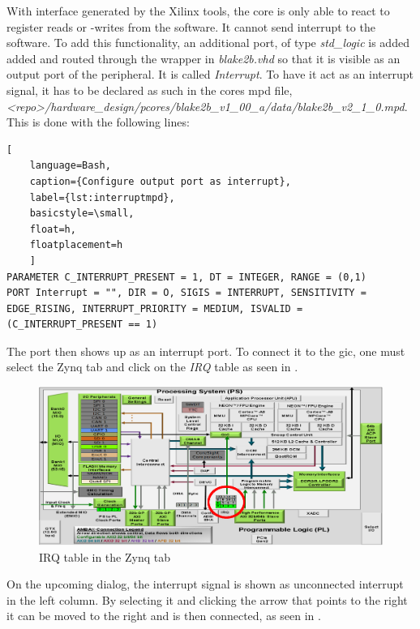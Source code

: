 With interface generated by the Xilinx tools, the core is only able to react to
register reads or -writes from the software.
It cannot send interrupt to the software.
To add this functionality, an additional port, of type \emph{std\_logic} is
added added and routed through the wrapper in \emph{blake2b.vhd} so that it is
visible as an output port of the peripheral.
It is called \emph{Interrupt}.
To have it act as an interrupt signal, it has to be declared as such in the
cores \gls{mpd} file,
\emph{<repo>/hardware_design/pcores/blake2b_v1_00_a/data/blake2b\_v2\_1\_0.mpd}.
This is done with the following lines:

\begin{lstlisting}[
	language=Bash,
	caption={Configure output port as interrupt},
	label={lst:interruptmpd},
	basicstyle=\small,
	float=h,
	floatplacement=h
	]
PARAMETER C_INTERRUPT_PRESENT = 1, DT = INTEGER, RANGE = (0,1)
PORT Interrupt = "", DIR = O, SIGIS = INTERRUPT, SENSITIVITY = EDGE_RISING, INTERRUPT_PRIORITY = MEDIUM, ISVALID = (C_INTERRUPT_PRESENT == 1)
\end{lstlisting}

The port then shows up as an interrupt port.
To connect it to the \gls{gic}, one must select the Zynq tab and click on the
\emph{IRQ} table as seen in .

\begin{figure}[h]
\centering
\includegraphics[width=1\textwidth]{sections/methodology/gic}
\caption{\label{fig:gic} IRQ table in the Zynq tab}
\end{figure}

On the upcoming dialog, the interrupt signal is shown as unconnected interrupt
in the left column.
By selecting it and clicking the arrow that points to the right it can be moved
to the right and is then connected, as seen in .

